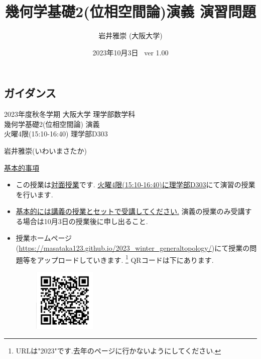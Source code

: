 \documentclass[dvipdfmx,a4paper,11pt]{article}
\title{幾何学基礎2(位相空間論)演義 演習問題}
\author{岩井雅崇 (大阪大学)}
\date{2023年10月3日 \, ver 1.00}
\theoremstyle{definition}
\begin{document}
\maketitle
\tableofcontents
\newpage

\begin{center}
\setcounter{section}{-1}
\section{ガイダンス}
\label{sec-guide}
\end{center}

\begin{center}
{\Large 2023年度秋冬学期 大阪大学 理学部数学科 \\ 幾何学基礎2(位相空間論) 演義} \\
 火曜4限(15:10-16:40) 理学部D303
\end{center}
\begin{flushright}
 岩井雅崇(いわいまさたか) \\
\end{flushright}
{\Large \underline{基本的事項}}
\begin{itemize}
  \setlength{\parskip}{0cm} %
  \setlength{\itemsep}{0cm} %
\item この授業は\underline{対面授業}です. \underline{火曜4限(15:10-16:40)に理学部D303}にて演習の授業を行います.
\item \underline{基本的には講義の授業とセットで受講してください.} 演義の授業のみ受講する場合は10月3日の授業後に申し出ること. 
\item 授業ホームページ(\url{https://masataka123.github.io/2023_winter_generaltopology/})にて授業の問題等をアップロードしていきます. \footnote{URLは"2023"です.去年のページに行かないようにしてください. }
QRコードは下にあります.
\begin{figure}[htbp]
\begin{center}
 \includegraphics[height=30mm, width=30mm]{genetopo.png}
\end{center}
\end{figure}
\end{itemize}

\end{document}
